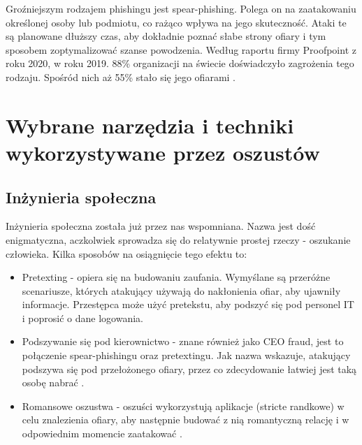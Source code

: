 \documentclass[]{article}
\begin{document}
Groźniejszym rodzajem phishingu jest spear-phishing. Polega on na zaatakowaniu określonej osoby lub podmiotu, co rażąco wpływa na jego skuteczność. Ataki te są planowane dłuższy czas, aby dokładnie poznać słabe strony ofiary i tym sposobem zoptymalizować szanse powodzenia. Według raportu firmy Proofpoint z roku 2020, w roku 2019. 88\% organizacji na świecie doświadczyło zagrożenia tego rodzaju. Spośród nich aż 55\% stało się jego ofiarami \cite{proofpoint2020}.


\newpage
\section{Wybrane narzędzia i techniki wykorzystywane przez oszustów}

\subsection{Inżynieria społeczna}
Inżynieria społeczna została już przez nas wspomniana. Nazwa jest dość enigmatyczna, aczkolwiek sprowadza się do relatywnie prostej rzeczy - oszukanie człowieka. Kilka sposobów na osiągnięcie tego efektu to:
\begin{itemize}[label=$\rightarrow$]
	\item Pretexting - opiera się na budowaniu zaufania. Wymyślane są przeróżne scenariusze, których atakujący używają do nakłonienia ofiar, aby ujawniły informacje. Przestępca może użyć pretekstu, aby podszyć się pod personel IT i poprosić o dane logowania.
	\item Podszywanie się pod kierownictwo - znane również jako CEO fraud, jest to połączenie spear-phishingu oraz pretextingu. Jak nazwa wskazuje, atakujący podszywa się pod przełożonego ofiary, przez co zdecydowanie łatwiej jest taką osobę nabrać .
	\item Romansowe oszustwa - oszuści wykorzystują aplikacje (stricte randkowe) w celu znalezienia ofiary, aby następnie budować z nią romantyczną relację i w odpowiednim momencie zaatakować \cite{abnormal_phishingtypes}.
\end{itemize} 
\end{document}
